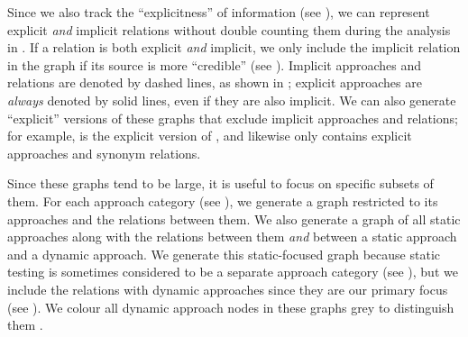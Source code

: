 
    \label{graphExplicit}
    Since we also track the ``explicitness'' of information
    (see ), we can represent explicit
    \emph{and} implicit relations without double counting them during the
    analysis in . If a relation is both explicit
    \emph{and} implicit, we only include the implicit relation in the graph
    if its source is more ``credible'' (see ).%
    Implicit approaches and relations are denoted by dashed lines, as shown
    in ; explicit approaches are %
    \emph{always} denoted by solid lines, even if they are also implicit.
    We can also generate ``explicit'' versions of these graphs that exclude
    implicit approaches and relations; for example, 
    is the explicit version of , and
     likewise only contains explicit approaches and
    synonym relations.

\fi
Since these graphs tend to be large, it is useful to focus on specific
subsets of them. \ifnotpaper For each approach category (see
    ), we generate a graph restricted to its approaches
    and the relations between them. We also generate a graph of all static
    approaches along with the relations between them \emph{and} between a
    static approach and a dynamic approach. We generate this static-focused
    graph because static testing is sometimes considered to be a separate
    approach category (see ), but we include the
    relations with dynamic approaches since they are our primary focus
    (see ). We colour all dynamic approach nodes in these
    graphs grey
    to distinguish them%
    .

